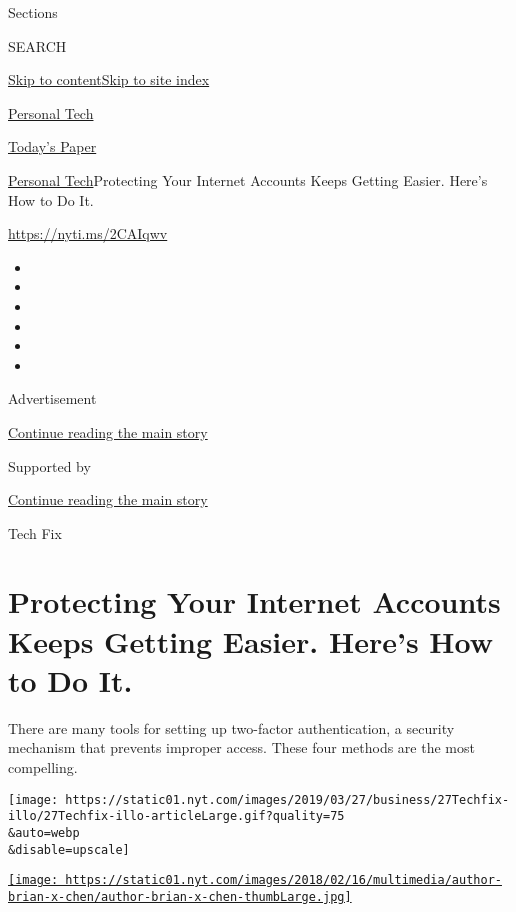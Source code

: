 Sections

SEARCH

\protect\hyperlink{site-content}{Skip to
content}\protect\hyperlink{site-index}{Skip to site index}

\href{https://www.nytimes.com/section/technology/personaltech}{Personal
Tech}

\href{https://myaccount.nytimes.com/auth/login?response_type=cookie\&client_id=vi}{}

\href{https://www.nytimes.com/section/todayspaper}{Today's Paper}

\href{/section/technology/personaltech}{Personal
Tech}\textbar{}Protecting Your Internet Accounts Keeps Getting Easier.
Here's How to Do It.

\url{https://nyti.ms/2CAIqwv}

\begin{itemize}
\item
\item
\item
\item
\item
\item
\end{itemize}

Advertisement

\protect\hyperlink{after-top}{Continue reading the main story}

Supported by

\protect\hyperlink{after-sponsor}{Continue reading the main story}

Tech Fix

\hypertarget{protecting-your-internet-accounts-keeps-getting-easier-heres-how-to-do-it}{%
\section{Protecting Your Internet Accounts Keeps Getting Easier. Here's
How to Do
It.}\label{protecting-your-internet-accounts-keeps-getting-easier-heres-how-to-do-it}}

There are many tools for setting up two-factor authentication, a
security mechanism that prevents improper access. These four methods are
the most compelling.

\texttt{[image: https://static01.nyt.com/images/2019/03/27/business/27Techfix-illo/27Techfix-illo-articleLarge.gif?quality=75\\\&auto=webp\\\&disable=upscale]}

\href{https://www.nytimes.com/by/brian-x-chen}{\texttt{[image: https://static01.nyt.com/images/2018/02/16/multimedia/author-brian-x-chen/author-brian-x-chen-thumbLarge.jpg]}}

